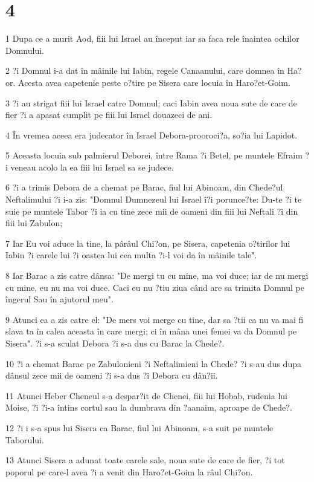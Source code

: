 \chapter{4}

\par 1 Dupa ce a murit Aod, fiii lui Israel au început iar sa faca rele înaintea ochilor Domnului.
\par 2 ?i Domnul i-a dat în mâinile lui Iabin, regele Canaanului, care domnea în Ha?or. Acesta avea capetenie peste o?tire pe Sisera care locuia în Haro?et-Goim.
\par 3 ?i au strigat fiii lui Israel catre Domnul; caci Iabin avea noua sute de care de fier ?i a apasat cumplit pe fiii lui Israel douazeci de ani.
\par 4 În vremea aceea era judecator în Israel Debora-prooroci?a, so?ia lui Lapidot.
\par 5 Aceasta locuia sub palmierul Deborei, între Rama ?i Betel, pe muntele Efraim ?i veneau acolo la ea fiii lui Israel sa se judece.
\par 6 ?i a trimis Debora de a chemat pe Barac, fiul lui Abinoam, din Chede?ul Neftalimului ?i i-a zis: "Domnul Dumnezeul lui Israel î?i porunce?te: Du-te ?i te suie pe muntele Tabor ?i ia cu tine zece mii de oameni din fiii lui Neftali ?i din fiii lui Zabulon;
\par 7 Iar Eu voi aduce la tine, la pârâul Chi?on, pe Sisera, capetenia o?tirilor lui Iabin ?i carele lui ?i oastea lui cea multa ?i-l voi da în mâinile tale".
\par 8 Iar Barac a zis catre dânsa: "De mergi tu cu mine, ma voi duce; iar de nu mergi cu mine, eu nu ma voi duce. Caci eu nu ?tiu ziua când are sa trimita Domnul pe îngerul Sau în ajutorul meu".
\par 9 Atunci ea a zis catre el: "De mers voi merge cu tine, dar sa ?tii ca nu va mai fi slava ta în calea aceasta în care mergi; ci în mâna unei femei va da Domnul pe Sisera". ?i s-a sculat Debora ?i s-a dus cu Barac la Chede?.
\par 10 ?i a chemat Barac pe Zabulonieni ?i Neftalimieni la Chede? ?i s-au dus dupa dânsul zece mii de oameni ?i s-a dus ?i Debora cu dân?ii.
\par 11 Atunci Heber Cheneul s-a despar?it de Chenei, fiii lui Hobab, rudenia lui Moise, ?i ?i-a întins cortul sau la dumbrava din ?aanaim, aproape de Chede?.
\par 12 ?i i s-a spus lui Sisera ca Barac, fiul lui Abinoam, s-a suit pe muntele Taborului.
\par 13 Atunci Sisera a adunat toate carele sale, noua sute de care de fier, ?i tot poporul pe care-l avea ?i a venit din Haro?et-Goim la râul Chi?on.
